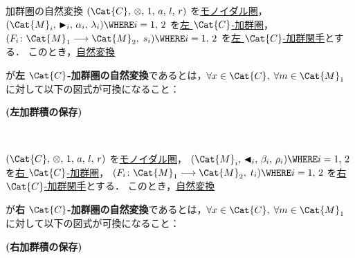\documentclass[TQFT_main]{subfiles}
\begin{document}
\begin{mydef}[label=def:module-nat,breakable]{加群圏の自然変換}
    $(\Cat{C},\, \otimes,\, 1,\, a,\, l,\, r)$ を\hyperref[redef:monoidal-category]{モノイダル圏}，
    $(\Cat{M}_i,\, \btr_i,\, \alpha_i,\, \lambda_i) \WHERE i=1,\, 2$ を\hyperref[def:modulecat]{左 $\Cat{C}$-加群圏}，
    $(F_i \colon \Cat{M}_1 \lto \Cat{M}_2,\; s_i) \WHERE i=1,\, 2$ を\hyperref[def:module-functor]{左 $\Cat{C}$-加群関手}とする．
    このとき，\hyperref[def:nat]{自然変換}
    \begin{center}
    \end{center}
    が\textbf{左 $\Cat{C}$-加群圏の自然変換}であるとは，$\forall x \in \Cat{C},\; \forall m \in \Cat{M}_1$ に対して以下の図式が可換になること：
    \begin{description}
        \item[\textbf{(左加群積の保存)}]　
        
        \begin{center}
        \end{center}
    \end{description}
    
    \tcblower

    $(\Cat{C},\, \otimes,\, 1,\, a,\, l,\, r)$ を\hyperref[redef:monoidal-category]{モノイダル圏}，
    $(\Cat{M}_i,\, \btl_i,\, \beta_i,\, \rho_i) \WHERE i=1,\, 2$ を\hyperref[def:modulecat]{右 $\Cat{C}$-加群圏}，
    $(F_i \colon \Cat{M}_1 \lto \Cat{M}_2,\; t_i) \WHERE i=1,\, 2$ を\hyperref[def:module-functor]{右 $\Cat{C}$-加群関手}とする．
    このとき，\hyperref[def:nat]{自然変換}
    \begin{center}
    \end{center}
    が\textbf{右 $\Cat{C}$-加群圏の自然変換}であるとは，$\forall x \in \Cat{C},\; \forall m \in \Cat{M}_1$ に対して以下の図式が可換になること：
    \begin{description}
        \item[\textbf{(右加群積の保存)}]　
        

\end{description}
\end{mydef}
\end{document}
